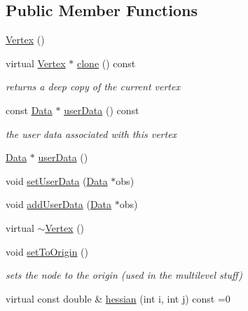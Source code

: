 \subsection*{Public Member Functions}
\begin{DoxyCompactItemize}
\item 
\hyperlink{classg2o_1_1OptimizableGraph_1_1Vertex_a1f5fd4210abfa0f8b8e7dd279f561986}{Vertex} ()
\item 
virtual \hyperlink{classg2o_1_1OptimizableGraph_1_1Vertex}{Vertex} $\ast$ \hyperlink{classg2o_1_1OptimizableGraph_1_1Vertex_a39fcfce620de93375a33e7947a21770c}{clone} () const 
\begin{DoxyCompactList}\small\item\em returns a deep copy of the current vertex \end{DoxyCompactList}\item 
const \hyperlink{classg2o_1_1OptimizableGraph_1_1Data}{Data} $\ast$ \hyperlink{classg2o_1_1OptimizableGraph_1_1Vertex_af01649f3b760b00c375bc87d8d129806}{user\+Data} () const 
\begin{DoxyCompactList}\small\item\em the user data associated with this vertex \end{DoxyCompactList}\item 
\hyperlink{classg2o_1_1OptimizableGraph_1_1Data}{Data} $\ast$ \hyperlink{classg2o_1_1OptimizableGraph_1_1Vertex_a768057be134ffe93bc88b020d031eee5}{user\+Data} ()
\item 
void \hyperlink{classg2o_1_1OptimizableGraph_1_1Vertex_a858d15a4fadebfc8bce0162ac675f608}{set\+User\+Data} (\hyperlink{classg2o_1_1OptimizableGraph_1_1Data}{Data} $\ast$obs)
\item 
void \hyperlink{classg2o_1_1OptimizableGraph_1_1Vertex_a8f7ac810cad82a004365c1221fd16234}{add\+User\+Data} (\hyperlink{classg2o_1_1OptimizableGraph_1_1Data}{Data} $\ast$obs)
\item 
virtual \hyperlink{classg2o_1_1OptimizableGraph_1_1Vertex_ac2208bfef95bba9670f13933d68fb929}{$\sim$\+Vertex} ()
\item 
void \hyperlink{classg2o_1_1OptimizableGraph_1_1Vertex_ab10678592b5e707bf4abdc0ff6b8e4bf}{set\+To\+Origin} ()
\begin{DoxyCompactList}\small\item\em sets the node to the origin (used in the multilevel stuff) \end{DoxyCompactList}\item 
virtual const double \& \hyperlink{classg2o_1_1OptimizableGraph_1_1Vertex_af46fa4f0baa4c87e29b137f24e713acb}{hessian} (int i, int j) const =0

\end{DoxyCompactItemize}
